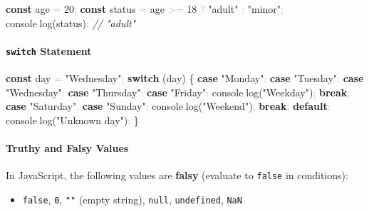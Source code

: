 \documentclass[
  justified,
  openright,
]{tufte-book}
\let\subsection\paragraph
\let\paragraph\paragraph
\newcommand{\KeywordTok}[1]{\textcolor{CodeKeyword}{\textbf{#1}}}  %
\newcommand{\StringTok}[1]{\textcolor{CodeString}{#1}}              %
\newcommand{\CommentTok}[1]{\textcolor{CodeComment}{\textit{#1}}}  %
\newcommand{\CodeNumTok}[1]{\textcolor{CodeNumber}{#1}}             %
\newcommand{\CodeFuncTok}[1]{\textcolor{CodeKeyword}{#1}}           %
\newcommand{\OperatorTok}[1]{\textcolor{DarkGray}{#1}}              %
\newenvironment{Shaded}{%
  \begin{mdframed}[style=TufteCode]%
}{%
  \end{mdframed}%
}
\let\subsection\paragraph
\let\paragraph\paragraph
\providecommand{\tightlist}{%
  \setlength{\itemsep}{0pt}\setlength{\parskip}{0pt}}
\begin{document}
\begin{Shaded}
\begin{Highlighting}[]
\KeywordTok{const} age \OperatorTok{=} \CodeNumTok{20}\OperatorTok{;}
\KeywordTok{const} status \OperatorTok{=} age \OperatorTok{\textgreater{}=} \CodeNumTok{18} \OperatorTok{?} \StringTok{"adult"} \OperatorTok{:} \StringTok{"minor"}\OperatorTok{;}
console\OperatorTok{.}\CodeFuncTok{log}(status)\OperatorTok{;} \CommentTok{// "adult"}
\end{Highlighting}
\end{Shaded}

\subsection{\texorpdfstring{\texttt{switch}
Statement}{switch Statement}}\label{switch-statement}

\begin{Shaded}
\begin{Highlighting}[]
\KeywordTok{const} day \OperatorTok{=} \StringTok{"Wednesday"}\OperatorTok{;}
\KeywordTok{switch} (day) \{
  \KeywordTok{case} \StringTok{"Monday"}\OperatorTok{:}
  \KeywordTok{case} \StringTok{"Tuesday"}\OperatorTok{:}
  \KeywordTok{case} \StringTok{"Wednesday"}\OperatorTok{:}
  \KeywordTok{case} \StringTok{"Thursday"}\OperatorTok{:}
  \KeywordTok{case} \StringTok{"Friday"}\OperatorTok{:}
    console\OperatorTok{.}\CodeFuncTok{log}(\StringTok{"Weekday"})\OperatorTok{;}
    \KeywordTok{break}\OperatorTok{;}
  \KeywordTok{case} \StringTok{"Saturday"}\OperatorTok{:}
  \KeywordTok{case} \StringTok{"Sunday"}\OperatorTok{:}
    console\OperatorTok{.}\CodeFuncTok{log}(\StringTok{"Weekend"})\OperatorTok{;}
    \KeywordTok{break}\OperatorTok{;}
  \KeywordTok{default}\OperatorTok{:}
    console\OperatorTok{.}\CodeFuncTok{log}(\StringTok{"Unknown day"})\OperatorTok{;}
\}
\end{Highlighting}
\end{Shaded}

\subsection{Truthy and Falsy Values}\label{truthy-and-falsy-values}

In JavaScript, the following values are \textbf{falsy} (evaluate to
\texttt{false} in conditions):

\begin{itemize}
\tightlist
\item
  \texttt{false}, \texttt{0}, \texttt{""} (empty string), \texttt{null},
  \texttt{undefined}, \texttt{NaN}
\end{itemize}
\end{document}
